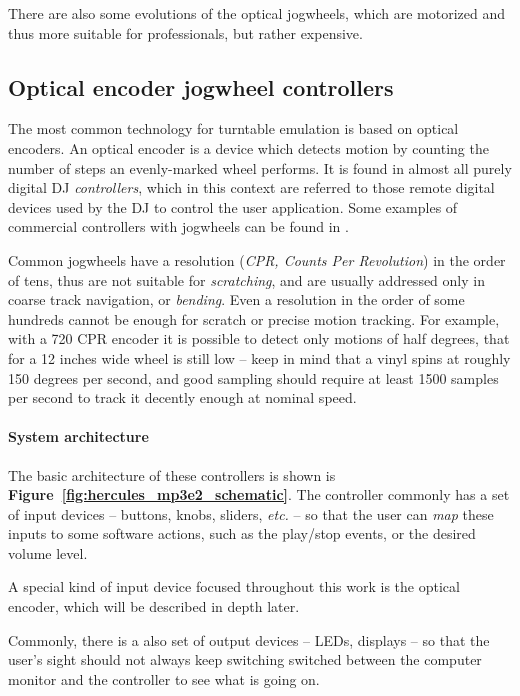 \documentclass[a4paper,10pt]{article}
\newcommand{\citef}[1]{\textbf{Figure~\ref{#1}}}
\begin{document}
\begin{multicols}{2}
There are also some evolutions of the optical jogwheels, which are motorized
\cite{denon_sc3900} \cite{numark_v7} and thus more suitable for professionals,
but rather expensive.


\subsection{Optical encoder jogwheel controllers}

The most common technology for turntable emulation is based on optical encoders.
An optical encoder is a device which detects motion by counting the number of
steps an evenly-marked wheel performs. It is found in almost all purely digital
DJ \emph{controllers}, which in this context are referred to those remote
digital devices used by the DJ to control the user application. Some examples
of commercial controllers with jogwheels can be found in \cite{eks_op}
\cite{pioneer_ddjs1} \cite{vestax_vci400}.

Common jogwheels have a resolution (\emph{CPR, Counts Per Revolution}) in the
order of tens, thus are not suitable for \emph{scratching}, and are usually
addressed only in coarse track navigation, or \emph{bending}.
Even a resolution in the order of some hundreds cannot be enough for scratch
or precise motion tracking. For example, with a 720 CPR encoder it is possible
to detect only motions of half degrees, that for a 12 inches wide wheel is
still low -- keep in mind that a vinyl spins at roughly 150 degrees per second,
and good sampling should require at least 1500 samples per second to track it
decently enough at nominal speed.


\paragraph{System architecture}
The basic architecture of these controllers is shown is \citef{fig:hercules_mp3e2_schematic}.
The controller commonly has a set of input devices -- buttons, knobs,
sliders, \emph{etc.} -- so that the user can \emph{map} these inputs to some
software actions, such as the play/stop events, or the desired volume level.

A special kind of input device focused throughout this work is the optical
encoder, which will be described in depth later.

Commonly, there is a also set of output devices -- LEDs, displays -- so that
the user's sight should not always keep switching switched between the computer
monitor and the controller to see what is going on.


\end{multicols}
\end{document}
